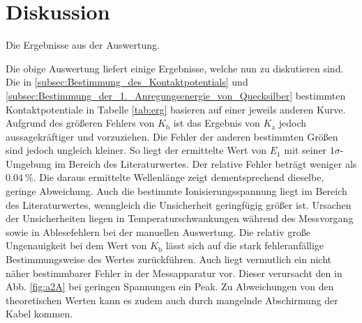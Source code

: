
\section{Diskussion}
\label{sec:Diskussion}
\begin{table}
	\caption{Die Ergebnisse aus der Auswertung.}
	\centering
	
	\label{tab:erg}
\end{table}
Die obige Auswertung liefert einige Ergebnisse, welche nun zu diskutieren sind.
 Die in \ref{subsec:Bestimmung_des_Kontaktpotentials} und \ref{subsec:Bestimmung_der_1._Anregungsenergie_von_Quecksilber} bestimmten Kontaktpotentiale in Tabelle \ref{tab:erg} basieren auf einer
jeweils anderen Kurve. Aufgrund des größeren Fehlers von $K_\text{b}$ ist das
Ergebnis von $K_\text{a}$ jedoch aussagekräftiger und vorzuziehen. Die Fehler der anderen bestimmten
Größen sind jedoch ungleich kleiner.
So liegt der ermittelte Wert von $E_1$ mit seiner $1\sigma$-Umgebung im
Bereich des Literaturwertes. Der relative Fehler beträgt weniger als $\SI{0.04}{\percent}$.
Die daraus ermittelte Wellenlänge zeigt dementsprechend dieselbe, geringe Abweichung. Auch die
 bestimmte Ionisierungsspannung liegt im Bereich des Literaturwertes, wenngleich die Unsicherheit geringfügig größer ist.
Ursachen der Unsicherheiten liegen in Temperaturschwankungen während des
Messvorgang sowie in Ablesefehlern bei der manuellen Auswertung. Die relativ
große Ungenauigkeit bei dem Wert von $K_\text{b}$ lässt sich auf die stark fehleranfällige Bestimmungsweise des Wertes zurückführen. Auch liegt vermutlich ein nicht näher bestimmbarer Fehler in der Messapparatur vor. Dieser verursacht den in Abb. \ref{fig:a2A} bei geringen Spannungen ein Peak. Zu Abweichungen von den theoretischen Werten kann es zudem auch durch mangelnde Abschirmung der Kabel kommen.

